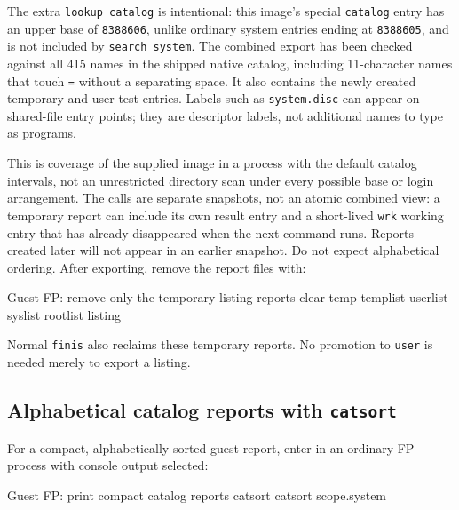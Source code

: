 The extra \passthrough{\lstinline!lookup catalog!} is intentional: this image's special \passthrough{\lstinline!catalog!} entry has an upper base of \passthrough{\lstinline!8388606!}, unlike ordinary system entries ending at \passthrough{\lstinline!8388605!}, and is not included by \passthrough{\lstinline!search system!}. The combined export has been checked against all 415 names in the shipped native catalog, including 11-character names that touch \passthrough{\lstinline!=!} without a separating space. It also contains the newly created temporary and user test entries. Labels such as \passthrough{\lstinline!system.disc!} can appear on shared-file entry points; they are descriptor labels, not additional names to type as programs.

This is coverage of the supplied image in a process with the default catalog intervals, not an unrestricted directory scan under every possible base or login arrangement. The calls are separate snapshots, not an atomic combined view: a temporary report can include its own result entry and a short-lived \texttt{wrk} working entry that has already disappeared when the next command runs. Reports created later will not appear in an earlier snapshot. Do not expect alphabetical ordering. After exporting, remove the report files with:

\begin{commandexample}{Guest FP: remove only the temporary listing reports}
clear temp templist userlist syslist rootlist listing
\end{commandexample}

Normal \passthrough{\lstinline!finis!} also reclaims these temporary reports. No promotion to \passthrough{\lstinline!user!} is needed merely to export a listing.

\subsection{\texorpdfstring{Alphabetical catalog reports with \texttt{catsort}}{Alphabetical catalog reports with catsort}}\label{alphabetical-catalog-reports-with-catsort}

For a compact, alphabetically sorted guest report, enter in an ordinary FP process with console output selected:

\begin{commandexample}{Guest FP: print compact catalog reports}
catsort
catsort scope.system
\end{commandexample}

